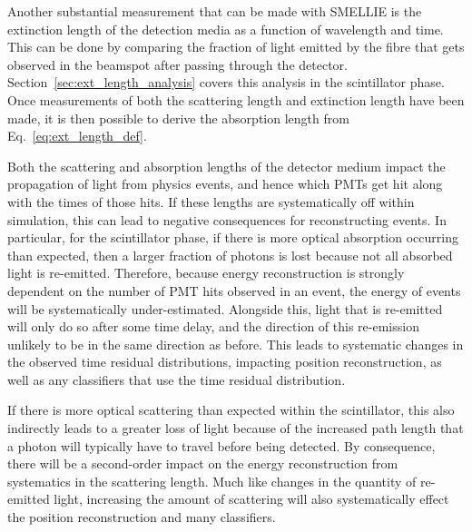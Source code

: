 Another substantial measurement that can be made with SMELLIE is the extinction length of the detection media as a function of wavelength and time. This can be done by comparing the fraction of light emitted by the fibre that gets observed in the beamspot after passing through the detector. Section~\ref{sec:ext_length_analysis} covers this analysis in the scintillator phase. Once measurements of both the scattering length and extinction length have been made, it is then possible to derive the absorption length from Eq.~\ref{eq:ext_length_def}.

Both the scattering and absorption lengths of the detector medium impact the propagation of light from physics events, and hence which PMTs get hit along with the times of those hits. If these lengths are systematically off within simulation, this can lead to negative consequences for reconstructing events. In particular, for the scintillator phase, if there is more optical absorption occurring than expected, then a larger fraction of photons is lost because not all absorbed light is re-emitted. Therefore, because energy reconstruction is strongly dependent on the number of PMT hits observed in an event, the energy of events will be systematically under-estimated. Alongside this, light that is re-emitted will only do so after some time delay, and the direction of this re-emission unlikely to be in the same direction as before. This leads to systematic changes in the observed time residual distributions, impacting position reconstruction, as well as any classifiers that use the time residual distribution.

If there is more optical scattering than expected within the scintillator, this also indirectly leads to a greater loss of light because of the increased path length that a photon will typically have to travel before being detected. By consequence, there will be a second-order impact on the energy reconstruction from systematics in the scattering length. Much like changes in the quantity of re-emitted light, increasing the amount of scattering will also systematically effect the position reconstruction and many classifiers.


